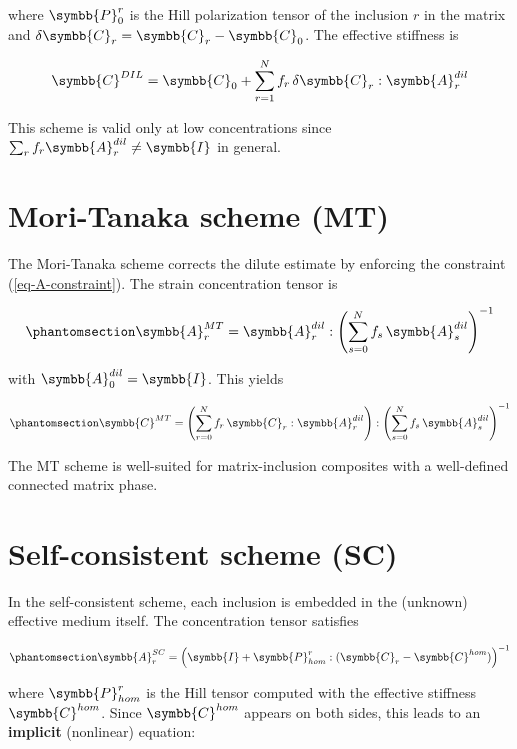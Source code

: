 \documentclass[
  a4paper,
  numbers=noendperiod,
  DIV=12]{scrreprt}
\newcommand{\uuuu}[1]{{\symbb{{#1}}}}
\begin{document}
where \(\uuuu{P}_0^r\) is the Hill polarization tensor of the inclusion
\(r\) in the matrix and \(\delta\uuuu{C}_r = \uuuu{C}_r - \uuuu{C}_0\).
The effective stiffness is

\[
\uuuu{C}^{DIL} = \uuuu{C}_0 + \sum_{r=1}^{N} f_r \, \delta\uuuu{C}_r : \uuuu{A}_r^{dil}
\]

This scheme is valid only at low concentrations since
\(\sum_r f_r \uuuu{A}_r^{dil} \neq \uuuu{I}\) in general.

\section{Mori-Tanaka scheme (MT)}\label{sec-mt-deriv}

The Mori-Tanaka scheme corrects the dilute estimate by enforcing the
constraint (\ref{eq-A-constraint}). The strain concentration tensor is

\begin{equation}\protect\phantomsection\label{eq-A-mt}{
\uuuu{A}_r^{MT} = \uuuu{A}_r^{dil} : \left(\sum_{s=0}^{N} f_s \, \uuuu{A}_s^{dil}\right)^{-1}
}\end{equation}

with \(\uuuu{A}_0^{dil} = \uuuu{I}\). This yields

\begin{equation}\protect\phantomsection\label{eq-C-mt}{
\uuuu{C}^{MT} = \left(\sum_{r=0}^{N} f_r \, \uuuu{C}_r : \uuuu{A}_r^{dil}\right) : \left(\sum_{s=0}^{N} f_s \, \uuuu{A}_s^{dil}\right)^{-1}
}\end{equation}

The MT scheme is well-suited for matrix-inclusion composites with a
well-defined connected matrix phase.

\section{Self-consistent scheme (SC)}\label{sec-sc-deriv}

In the self-consistent scheme, each inclusion is embedded in the
(unknown) effective medium itself. The concentration tensor satisfies

\begin{equation}\protect\phantomsection\label{eq-A-sc}{
\uuuu{A}_r^{SC} = \left(\uuuu{I} + \uuuu{P}_{hom}^r : (\uuuu{C}_r - \uuuu{C}^{hom})\right)^{-1}
}\end{equation}

where \(\uuuu{P}_{hom}^r\) is the Hill tensor computed with the
effective stiffness \(\uuuu{C}^{hom}\). Since \(\uuuu{C}^{hom}\) appears
on both sides, this leads to an \textbf{implicit} (nonlinear) equation:
\end{document}
